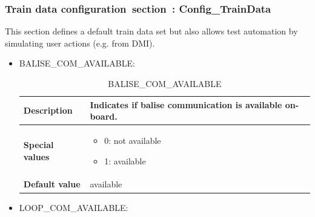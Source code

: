 \documentclass{template/openetcs}
\begin{document}
\subsubsection{Train data configuration section : Config\_TrainData}
This section defines a default train data set but also allows test automation by simulating user actions (e.g. from DMI).
	\begin{itemize}
		\item BALISE\_COM\_AVAILABLE:
		
			\begin{longtable}{|l|l|}
				\caption{BALISE\_COM\_AVAILABLE}\\ 
				\hline
				
					\begin{minipage}[t]{0.22\linewidth} \textbf{Description}	\end{minipage} 
				&	\begin{minipage}[t]{0.78\linewidth} Indicates if balise communication is available on-board. \end{minipage} \\
				
				\hline
																																									
					\begin{minipage}[t]{0.22\linewidth} \textbf{Special values}	\end{minipage} 
				&	\begin{minipage}[t]{0.78\linewidth} \begin{itemize} \item 0: not available \item 1: available \end{itemize} \end{minipage} \\
				
				\hline
				
					\begin{minipage}[t]{0.22\linewidth} \textbf{Default value}	\end{minipage} 
				&	\begin{minipage}[t]{0.78\linewidth} available \end{minipage} \\
				
				\hline
				
			\end{longtable}
			
		\item LOOP\_COM\_AVAILABLE:
				

\end{itemize}
\end{document}
